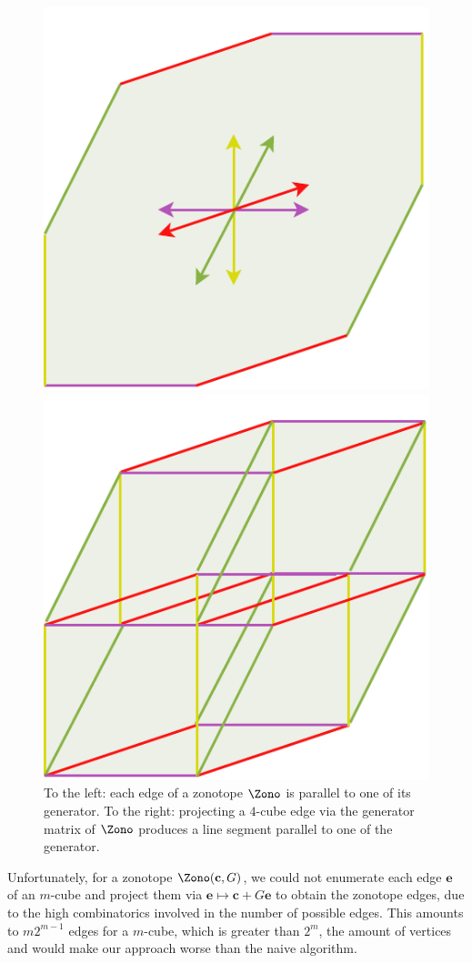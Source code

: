\begin{figure}[!htb]
    \captionsetup{justification=centering}
    \begin{minipage}{0.49\linewidth}
        \centering
        \includegraphics[trim={0 0 0 0},clip, width=0.55\linewidth]{img/chapter_2/zonotope_edges_parallel_generator.pdf}
    \end{minipage}
    \hfill
    \begin{minipage}{0.49\linewidth}
        \centering
        \includegraphics[trim={0 0 0 0},clip,width=0.55\linewidth]{img/chapter_2/zonotope_edges_parallel_generator_alt.pdf}
    \end{minipage}
    \caption{To the left: each edge of a zonotope $\Zono$ is parallel to one of its generator. To the right: projecting a $4$-cube edge via the generator matrix of $\Zono$ produces a line segment parallel to one of the generator.}
    \label{fig:zonotope_edges_parallel}
\end{figure}

Unfortunately, for a zonotope $\Zono(\mathbf{c}, G)$, we could not enumerate each edge $\mathbf{e}$ of an $m$-cube and project them via $\mathbf{e} \mapsto \mathbf{c} + G\mathbf{e}$ to obtain the zonotope edges, due to the high combinatorics involved in the number of possible edges. This amounts to $m2^{m-1}$ edges for a $m$-cube, which is greater than $2^m$, the amount of vertices and would make our approach worse than the naive algorithm.


